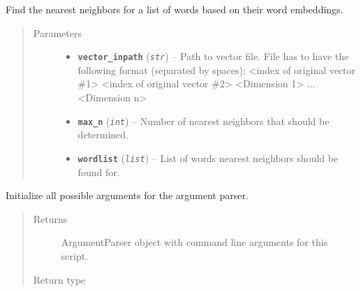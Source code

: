 \documentclass[letterpaper,10pt,english]{sphinxmanual}
\begin{document}
\begin{fulllineitems}
\label{src.eval:src.eval.eval_vectors.find_nearest_neighbors}
Find the nearest neighbors for a list of words based on their word embeddings.
\begin{quote}\begin{description}
\item[{Parameters}] \leavevmode\begin{itemize}
\item {} 
\textbf{\texttt{vector\_inpath}} (\emph{\texttt{str}}) -- Path to vector file. File has to have the following format (separated by spaces):
\textless{}index of original vector \#1\textgreater{} \textless{}index of original vector \#2\textgreater{} \textless{}Dimension 1\textgreater{} ... \textless{}Dimension n\textgreater{}

\item {} 
\textbf{\texttt{max\_n}} (\emph{\texttt{int}}) -- Number of nearest neighbors that should be determined.

\item {} 
\textbf{\texttt{wordlist}} (\emph{\texttt{list}}) -- List of words nearest neighbors should be found for.

\end{itemize}

\end{description}\end{quote}

\end{fulllineitems}


\begin{fulllineitems}
\label{src.eval:src.eval.eval_vectors.init_argparser}
Initialize all possible arguments for the argument parser.
\begin{quote}\begin{description}
\item[{Returns}] \leavevmode
ArgumentParser object with command line arguments for this script.

\item[{Return type}] \leavevmode
{}

\end{description}\end{quote}

\end{fulllineitems}
\end{document}
